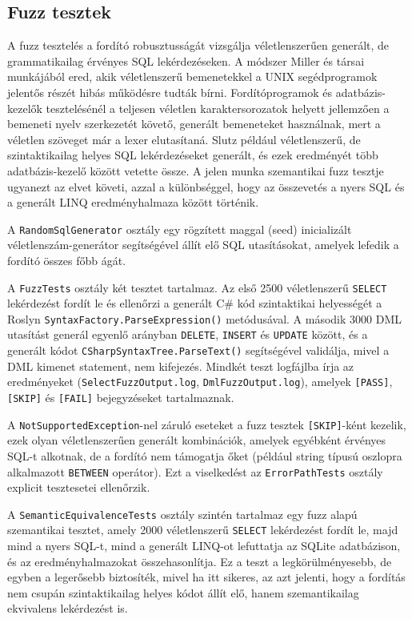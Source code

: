\documentclass[a4paper,12pt]{article}
\begin{document}
\subsection{Fuzz tesztek}

A fuzz tesztelés a fordító robusztusságát vizsgálja véletlenszerűen generált, de grammatikailag érvényes SQL lekérdezéseken. A módszer Miller és társai \cite{miller1990fuzz} munkájából ered, akik véletlenszerű bemenetekkel a UNIX segédprogramok jelentős részét hibás működésre tudták bírni. Fordítóprogramok és adatbázis-kezelők tesztelésénél a teljesen véletlen karaktersorozatok helyett jellemzően a bemeneti nyelv szerkezetét követő, generált bemeneteket használnak, mert a véletlen szöveget már a lexer elutasítaná. Slutz \cite{slutz1998rags} például véletlenszerű, de szintaktikailag helyes SQL lekérdezéseket generált, és ezek eredményét több adatbázis-kezelő között vetette össze. A jelen munka szemantikai fuzz tesztje ugyanezt az elvet követi, azzal a különbséggel, hogy az összevetés a nyers SQL és a generált LINQ eredményhalmaza között történik.

A \texttt{RandomSqlGenerator} osztály egy rögzített maggal (seed) inicializált véletlenszám-generátor segítségével állít elő SQL utasításokat, amelyek lefedik a fordító összes főbb ágát.

A \texttt{FuzzTests} osztály két tesztet tartalmaz. Az első 2500 véletlenszerű \texttt{SELECT} lekérdezést fordít le és ellenőrzi a generált C\# kód szintaktikai helyességét a Roslyn \texttt{SyntaxFactory.ParseExpression()} metódusával. A második 3000 DML utasítást generál egyenlő arányban \texttt{DELETE}, \texttt{INSERT} és \texttt{UPDATE} között, és a generált kódot \texttt{CSharpSyntaxTree.ParseText()} segítségével validálja, mivel a DML kimenet statement, nem kifejezés. Mindkét teszt logfájlba írja az eredményeket (\texttt{SelectFuzzOutput.log}, \texttt{DmlFuzzOutput.log}), amelyek \texttt{[PASS]}, \texttt{[SKIP]} és \texttt{[FAIL]} bejegyzéseket tartalmaznak.

A \texttt{NotSupportedException}-nel záruló eseteket a fuzz tesztek \texttt{[SKIP]}-ként kezelik, ezek olyan véletlenszerűen generált kombinációk, amelyek egyébként érvényes SQL-t alkotnak, de a fordító nem támogatja őket (például string típusú oszlopra alkalmazott \texttt{BETWEEN} operátor). Ezt a viselkedést az \texttt{ErrorPathTests} osztály explicit tesztesetei ellenőrzik.

A \texttt{SemanticEquivalenceTests} osztály szintén tartalmaz egy fuzz alapú szemantikai tesztet, amely 2000 véletlenszerű \texttt{SELECT} lekérdezést fordít le, majd mind a nyers SQL-t, mind a generált LINQ-ot lefuttatja az SQLite adatbázison, és az eredményhalmazokat összehasonlítja. Ez a teszt a legkörülményesebb, de egyben a legerősebb biztosíték, mivel ha itt sikeres, az azt jelenti, hogy a fordítás nem csupán szintaktikailag helyes kódot állít elő, hanem szemantikailag ekvivalens lekérdezést is.
\end{document}
